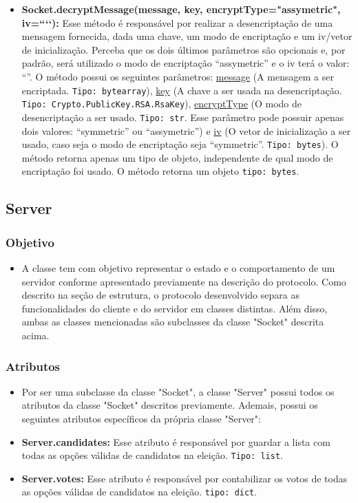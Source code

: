 \documentclass[10pt]{article}
\begin{document}
\begin{itemize}
\begin{itemize}
            \item \textbf{Socket.decryptMessage(message, key, encryptType="assymetric", iv=“‘‘):} Esse método é responsável por realizar a desencriptação de uma mensagem fornecida, dada uma chave, um modo de encriptação e um iv/vetor de inicialização. Perceba que os dois últimos parâmetros são opcionais e, por padrão, será utilizado o modo de encriptação “assymetric” e o iv terá o valor: “”. O método possui os seguintes parâmetros: \underline{message} (A mensagem a ser encriptada. \texttt{Tipo: bytearray}), \underline{key} (A chave a ser usada na desencriptação. \texttt{Tipo: Crypto.PublicKey.RSA.RsaKey}), \underline{encryptType} (O modo de desencriptação a ser usado. \texttt{Tipo: str}. Esse parâmetro pode possuir apenas dois valores: “symmetric” ou “assymetric”) e \underline{iv} (O vetor de inicialização a ser usado, caso seja o modo de encriptação seja “symmetric”. \texttt{Tipo: bytes}). O método retorna apenas um tipo de objeto, independente de qual modo de encriptação foi usado. O método retorna um objeto \texttt{tipo: bytes}.
            
            \end{itemize}
        
    \subsection{\Large Server}
        \subsubsection{\large Objetivo}
            \begin{itemize}
            \item A classe tem com objetivo representar o estado e o comportamento de um servidor conforme apresentado previamente na descrição do protocolo. Como descrito na seção de estrutura, o protocolo desenvolvido separa as funcionalidades do cliente e do servidor em classes distintas. Além disso, ambas as classes mencionadas são subclasses da classe "Socket" descrita acima.
            \end{itemize}
        \subsubsection{\large Atributos}
            \begin{itemize}
            \item Por ser uma subclasse da classe "Socket", a classe "Server"  possui todos os atributos da classe "Socket" descritos previamente. Ademais, possui os seguintes atributos específicos da própria classe "Server":
            \item \textbf{Server.candidates:}  Esse atributo é responsável por guardar a lista com todas as opções válidas de candidatos na eleição. \texttt{Tipo: list}.
            \item \textbf{Server.votes:} Esse atributo é responsável por contabilizar os votos de todas as opções válidas de candidatos na eleição. \texttt{tipo: dict}.
            \end{itemize}

\end{itemize}
\end{document}
